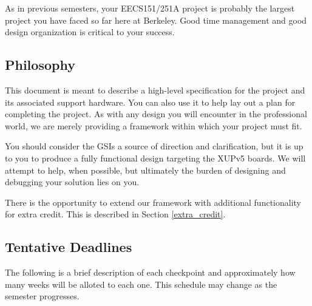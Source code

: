 \documentclass[11pt]{article}
\begin{document}
As in previous semesters, your EECS151/251A project is probably the largest project you have faced so far here at Berkeley. Good time management and good design organization is critical to your success.

\subsection{Philosophy}
\label{philosophy}

This document is meant to describe a high-level specification for the project and its associated support hardware. You can also use it to help lay out a plan for completing the project. As with any design you will encounter in the professional world, we are merely providing a framework within which your project must fit.

You should consider the GSIs a source of direction and clarification, but it is up to you to produce a fully functional design targeting the XUPv5 boards. We will attempt to help, when possible, but ultimately the burden of designing and debugging your solution lies on you.

There is the opportunity to extend our framework with additional functionality for extra credit. This is described in Section \ref{extra_credit}.

\subsection{Tentative Deadlines}
\label{tentative_deadlines}

The following is a brief description of each checkpoint and approximately how many weeks will be alloted to each one. This schedule may change as the semester progresses.
\end{document}
